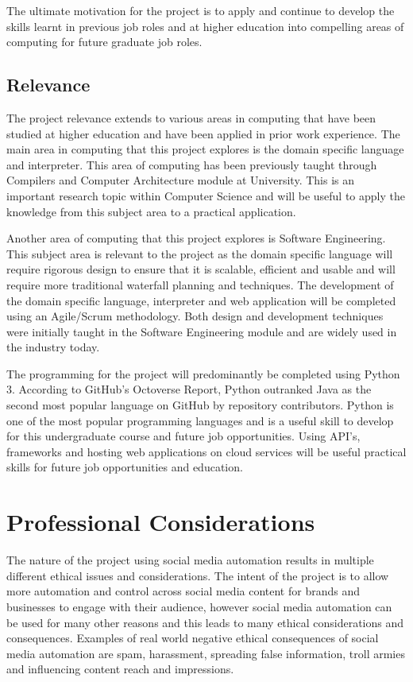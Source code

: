 \documentclass[chapterprefix=false]{scrreprt}
\begin{document}
The ultimate motivation for the project is to apply and continue to develop the skills learnt in previous job roles and at higher education into compelling areas of computing for future graduate job roles.


\subsection{Relevance}

The project relevance extends to various areas in computing that have been studied at higher education and have been applied in prior work experience. The main area in computing that this project explores is the domain specific language and interpreter. This area of computing has been previously taught through Compilers and Computer Architecture module at University. This is an important research topic within Computer Science and will be useful to apply the knowledge from this subject area to a practical application.

Another area of computing that this project explores is Software Engineering. This subject area is relevant to the project as the domain specific language will require rigorous design to ensure that it is scalable, efficient and usable and will require more traditional waterfall planning and techniques. The development of the domain specific language, interpreter and web application will be completed using an Agile/Scrum methodology. Both design and development techniques were initially taught in the Software Engineering module and are widely used in the industry today.

The programming for the project will predominantly be completed using Python 3. According to GitHub’s Octoverse Report, Python outranked Java as the second most popular language on GitHub by repository contributors\cite{github}. Python is one of the most popular programming languages and is a useful skill to develop for this undergraduate course and future job opportunities. Using API’s, frameworks and hosting web applications on cloud services will be useful practical skills for future job opportunities and education.


\newpage

\section{Professional Considerations}

The nature of the project using social media automation results in multiple different ethical issues and considerations. The intent of the project is to allow more automation and control across social media content for brands and businesses to engage with their audience, however social media automation can be used for many other reasons and this leads to many ethical considerations and consequences. Examples of real world negative ethical consequences of social media automation are spam, harassment, spreading false information, troll armies and influencing content reach and impressions.
\end{document}
